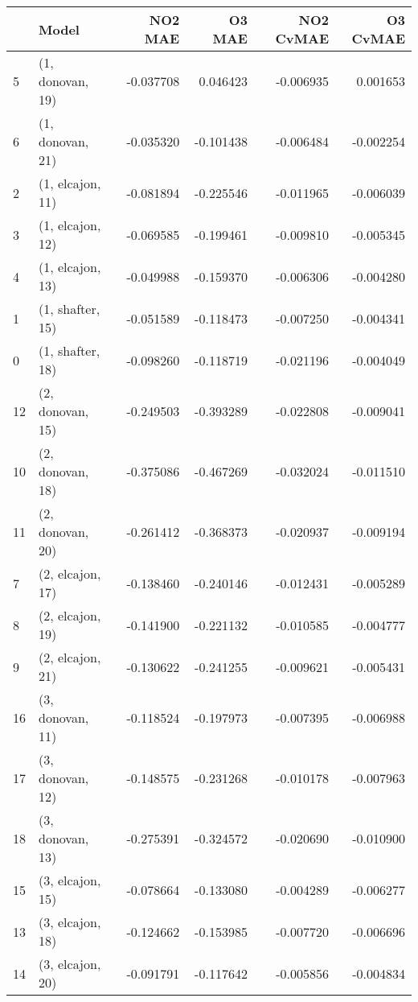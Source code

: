 \begin{tabular}{llrrrr}
\toprule
{} &             Model &   NO2 MAE &    O3 MAE &  NO2 CvMAE &  O3 CvMAE \\
\midrule
5  &  (1, donovan, 19) & -0.037708 &  0.046423 &  -0.006935 &  0.001653 \\
6  &  (1, donovan, 21) & -0.035320 & -0.101438 &  -0.006484 & -0.002254 \\
2  &  (1, elcajon, 11) & -0.081894 & -0.225546 &  -0.011965 & -0.006039 \\
3  &  (1, elcajon, 12) & -0.069585 & -0.199461 &  -0.009810 & -0.005345 \\
4  &  (1, elcajon, 13) & -0.049988 & -0.159370 &  -0.006306 & -0.004280 \\
1  &  (1, shafter, 15) & -0.051589 & -0.118473 &  -0.007250 & -0.004341 \\
0  &  (1, shafter, 18) & -0.098260 & -0.118719 &  -0.021196 & -0.004049 \\
12 &  (2, donovan, 15) & -0.249503 & -0.393289 &  -0.022808 & -0.009041 \\
10 &  (2, donovan, 18) & -0.375086 & -0.467269 &  -0.032024 & -0.011510 \\
11 &  (2, donovan, 20) & -0.261412 & -0.368373 &  -0.020937 & -0.009194 \\
7  &  (2, elcajon, 17) & -0.138460 & -0.240146 &  -0.012431 & -0.005289 \\
8  &  (2, elcajon, 19) & -0.141900 & -0.221132 &  -0.010585 & -0.004777 \\
9  &  (2, elcajon, 21) & -0.130622 & -0.241255 &  -0.009621 & -0.005431 \\
16 &  (3, donovan, 11) & -0.118524 & -0.197973 &  -0.007395 & -0.006988 \\
17 &  (3, donovan, 12) & -0.148575 & -0.231268 &  -0.010178 & -0.007963 \\
18 &  (3, donovan, 13) & -0.275391 & -0.324572 &  -0.020690 & -0.010900 \\
15 &  (3, elcajon, 15) & -0.078664 & -0.133080 &  -0.004289 & -0.006277 \\
13 &  (3, elcajon, 18) & -0.124662 & -0.153985 &  -0.007720 & -0.006696 \\
14 &  (3, elcajon, 20) & -0.091791 & -0.117642 &  -0.005856 & -0.004834 \\
\bottomrule
\end{tabular}
